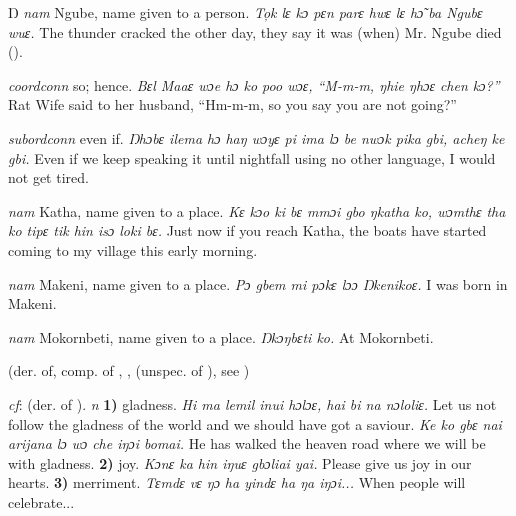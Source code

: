 \begin{letter}{Ŋ}
 \textit{nam} Ngube, name given to a person. \textit{To̦k lɛ kɔ pɛn parɛ hwɛ lɛ hɔ̃ ba Ngubɛ wuɛ.} The thunder cracked the other day, they say it was (when) Mr. Ngube died (\citealt{Pichl1967}). 



 \textit{coordconn} so; hence. \textit{Bɛl Maaɛ wɔe hɔ ko poo wɔɛ, “M-m-m, ŋhie ŋhɔɛ chen kɔ?”} Rat Wife said to her husband, “Hm-m-m, so you say you are not going?”

 \textit{subordconn} even if. \textit{Ŋhɔbɛ ilema hɔ haŋ wɔyɛ pi ima lɔ be nwɔk pika gbi, acheŋ ke gbi.} Even if we keep speaking it until nightfall using no other language, I would not get tired.

 \textit{nam} Katha, name given to a place. \textit{Kɛ kɔo ki bɛ mmɔi gbo ŋkatha ko, wɔmthɛ tha ko tipɛ tik hin isɔ loki bɛ.} Just now if you reach Katha, the boats have started coming to my village this early morning.

 \textit{nam} Makeni, name given to a place. \textit{Pɔ gbem mi pɔkɛ lɔɔ Ŋkenikoɛ.} I was born in Makeni.

 \textit{nam} Mokornbeti, name given to a place. \textit{Ŋkɔŋbɛti ko.} At Mokornbeti.

 (der. of, comp. of , ,  (unspec. of ), see ) 

 \textit{cf}:  (der. of ). \textit{n} \textbf{1)} gladness. \textit{Hi ma lemil inui hɔlɔɛ, hai bi na nɔloliɛ.} Let us not follow the gladness of the world and we should have got a saviour. \textit{Ke ko gbɛ nai arijana lɔ wɔ che iŋɔi bomai.} He has walked the heaven road where we will be with gladness. \textbf{2)} joy. \textit{Kɔnɛ ka hin iŋuɛ gbɔliai yai.} Please give us joy in our hearts. \textbf{3)} merriment. \textit{Tɛmdɛ vɛ ŋɔ ha yindɛ ha ŋa iŋɔi...} When people will celebrate...



\end{letter}

